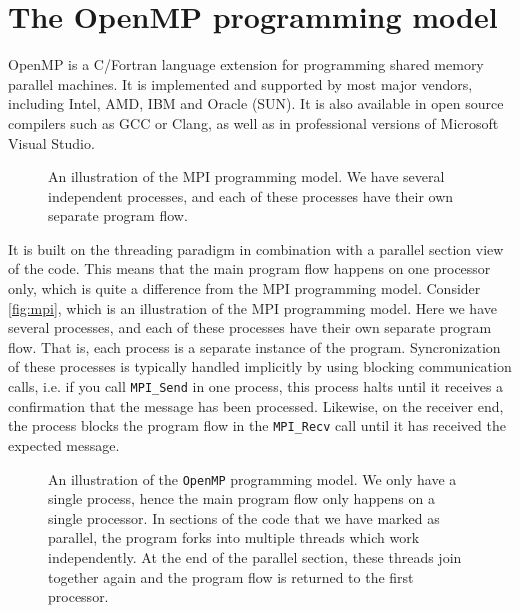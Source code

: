 \section{The OpenMP programming model}

OpenMP is a C/Fortran language extension for programming shared memory parallel
machines. It is implemented and supported by most major vendors, including
Intel, AMD, IBM and Oracle (SUN). It is also available in open source compilers
such as GCC or Clang, as well as in professional versions of Microsoft Visual
Studio.

\begin{figure}
  \centering
  \caption{
    An illustration of the MPI programming model. We have several independent
    processes, and each of these processes have their own separate program
    flow.
  }
  \label{fig:mpi}
\end{figure}

It is built on the threading paradigm in combination with a parallel section
view of the code. This means that the main program flow happens on one processor
only, which is quite a difference from the MPI programming model. Consider
\autoref{fig:mpi}, which is an illustration of the MPI programming model. Here
we have several processes, and each of these processes have their own separate
program flow. That is, each process is a separate instance of the program.
Syncronization of these processes is typically handled implicitly by using
blocking communication calls, i.e. if you call \texttt{MPI\_Send} in one
process, this process halts until it receives a confirmation that the message
has been processed. Likewise, on the receiver end, the process blocks the
program flow in the \texttt{MPI\_Recv} call until it has received the expected
message.

\begin{figure}
  \centering
  \caption{
    An illustration of the \texttt{OpenMP} programming model. We only have a
    single process, hence the main program flow only happens on a single
    processor. In sections of the code that we have marked as parallel, the
    program forks into multiple threads which work independently. At the end of
    the parallel section, these threads join together again and the program flow
    is returned to the first processor.
  }
  \label{fig:openmp}
\end{figure}

